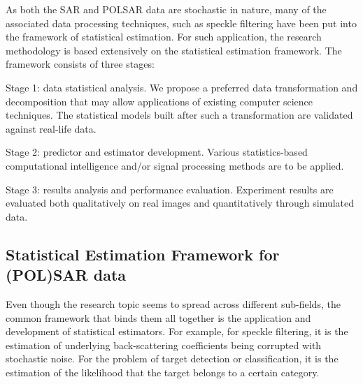   
As both the SAR and POLSAR data are stochastic in nature, many of the associated data processing techniques, such as speckle filtering have been put into the framework of statistical estimation.
For such application, the research methodology is based extensively on the statistical estimation framework. 
The framework consists of three stages:

\begin{description}
\item{Stage 1:} data statistical analysis. 
We propose a preferred data transformation and decomposition that may allow applications of existing computer science techniques. 
The statistical models built after such a transformation are validated against real-life data.
\item{Stage 2:} predictor and estimator development.
Various statistics-based computational intelligence and/or signal processing methods are to be applied. 
\item{Stage 3:} results analysis and performance evaluation.
Experiment results are evaluated both qualitatively on real images and quantitatively through simulated data. 
\end{description}

\subsection{Statistical Estimation Framework for (POL)SAR data}

Even though the research topic seems to spread across different sub-fields, the common framework that binds them all together is the application and development of statistical estimators.
For example, for speckle filtering, it is the estimation of underlying back-scattering coefficients being corrupted with stochastic noise.
For the problem of target detection or classification,
  it is the estimation of the likelihood that the target belongs to a certain category.

